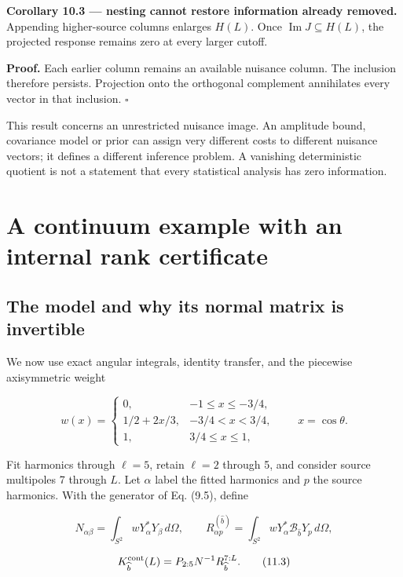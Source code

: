 \documentclass[
  11pt,
  a4paper]{article}
\begin{document}
\textbf{Corollary 10.3 --- nesting cannot restore information already removed.} Appending higher-source columns enlarges \(H(L)\). Once \(\operatorname{Im}J\subseteq H(L)\), the projected response remains zero at every larger cutoff.

\textbf{Proof.} Each earlier column remains an available nuisance column. The inclusion therefore persists. Projection onto the orthogonal complement annihilates every vector in that inclusion. \(\square\)

This result concerns an unrestricted nuisance image. An amplitude bound, covariance model or prior can assign very different costs to different nuisance vectors; it defines a different inference problem. A vanishing deterministic quotient is not a statement that every statistical analysis has zero information.

\hypertarget{a-continuum-example-with-an-internal-rank-certificate}{%
\section{A continuum example with an internal rank certificate}\label{a-continuum-example-with-an-internal-rank-certificate}}

\hypertarget{the-model-and-why-its-normal-matrix-is-invertible}{%
\subsection{The model and why its normal matrix is invertible}\label{the-model-and-why-its-normal-matrix-is-invertible}}

We now use exact angular integrals, identity transfer, and the piecewise axisymmetric weight

\[
w(x)=
\begin{cases}
0,&-1\le x\le-3/4,\\
1/2+2x/3,&-3/4<x<3/4,\\
1,&3/4\le x\le1,
\end{cases}
\qquad x=\cos\theta.
\tag{11.1}
\]

Fit harmonics through \(\ell=5\), retain \(\ell=2\) through 5, and consider source multipoles 7 through \(L\). Let \(\alpha\) label the fitted harmonics and \(p\) the source harmonics. With the generator of Eq. (9.5), define

\[
N_{\alpha\beta}=\int_{S^2}wY_\alpha^*Y_\beta\,d\Omega,
\qquad
R_{\alpha p}^{(\widehat b)}=\int_{S^2}wY_\alpha^*\mathcal B_{\widehat b}Y_p\,d\Omega,
\tag{11.2}
\]

\[
K_{\widehat b}^{\rm cont}(L)=P_{2:5}N^{-1}R_{\widehat b}^{7:L}.
\tag{11.3}
\]
\end{document}
